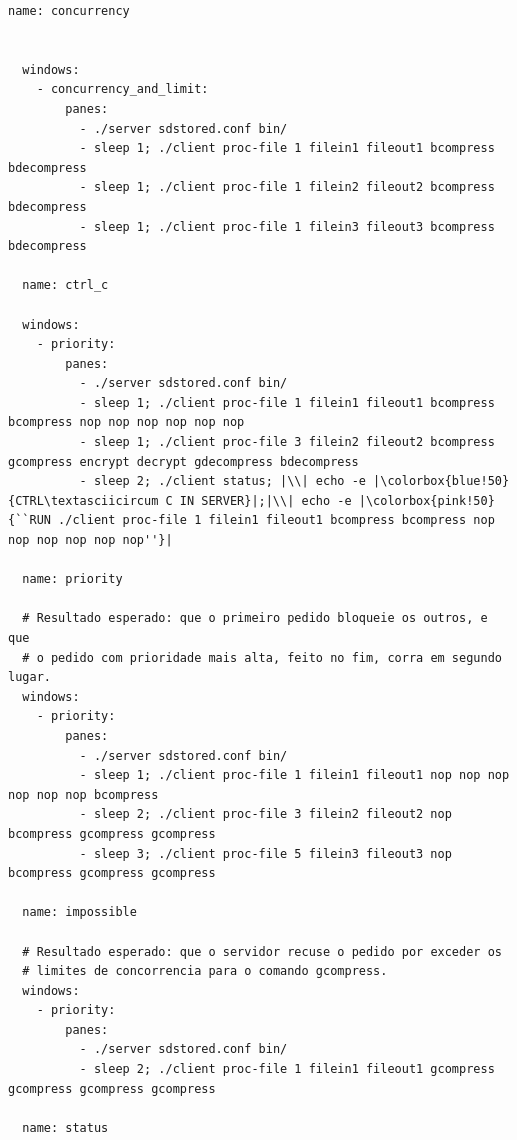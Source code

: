 \documentclass[11pt,a4paper]{report}%
\begin{document}
\label{code:tmuxinator}
\begin{lstlisting}[caption={Exemplo de configurações Tmuxinator}]
  name: concurrency

  
  windows:
    - concurrency_and_limit:
        panes:
          - ./server sdstored.conf bin/
          - sleep 1; ./client proc-file 1 filein1 fileout1 bcompress bdecompress
          - sleep 1; ./client proc-file 1 filein2 fileout2 bcompress bdecompress
          - sleep 1; ./client proc-file 1 filein3 fileout3 bcompress bdecompress

  name: ctrl_c

  windows:
    - priority:
        panes:
          - ./server sdstored.conf bin/
          - sleep 1; ./client proc-file 1 filein1 fileout1 bcompress bcompress nop nop nop nop nop nop
          - sleep 1; ./client proc-file 3 filein2 fileout2 bcompress gcompress encrypt decrypt gdecompress bdecompress
          - sleep 2; ./client status; |\\| echo -e |\colorbox{blue!50}{CTRL\textasciicircum C IN SERVER}|;|\\| echo -e |\colorbox{pink!50}{``RUN ./client proc-file 1 filein1 fileout1 bcompress bcompress nop nop nop nop nop nop''}|

  name: priority

  # Resultado esperado: que o primeiro pedido bloqueie os outros, e que
  # o pedido com prioridade mais alta, feito no fim, corra em segundo lugar.
  windows:
    - priority:
        panes:
          - ./server sdstored.conf bin/
          - sleep 1; ./client proc-file 1 filein1 fileout1 nop nop nop nop nop nop bcompress
          - sleep 2; ./client proc-file 3 filein2 fileout2 nop bcompress gcompress gcompress
          - sleep 3; ./client proc-file 5 filein3 fileout3 nop bcompress gcompress gcompress

  name: impossible

  # Resultado esperado: que o servidor recuse o pedido por exceder os
  # limites de concorrencia para o comando gcompress.
  windows:
    - priority:
        panes:
          - ./server sdstored.conf bin/
          - sleep 2; ./client proc-file 1 filein1 fileout1 gcompress gcompress gcompress gcompress

  name: status


\end{lstlisting}
\end{document}
